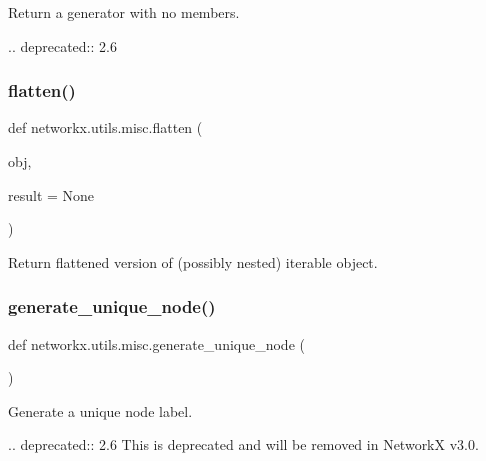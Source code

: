 \begin{DoxyVerb}Return a generator with no members.

.. deprecated:: 2.6
\end{DoxyVerb}
 \mbox{\label{namespacenetworkx_1_1utils_1_1misc_ab942ca72fb7de65e013cab73285c339d}} 
\subsubsection{\texorpdfstring{flatten()}{flatten()}}
{\footnotesize\ttfamily def networkx.\+utils.\+misc.\+flatten (\begin{DoxyParamCaption}\item[{}]{obj,  }\item[{}]{result = {\ttfamily None} }\end{DoxyParamCaption})}

\begin{DoxyVerb}Return flattened version of (possibly nested) iterable object.\end{DoxyVerb}
 \mbox{\label{namespacenetworkx_1_1utils_1_1misc_a3e735b0f0572a68c92123b6b2f842d1d}} 
\subsubsection{\texorpdfstring{generate\+\_\+unique\+\_\+node()}{generate\_unique\_node()}}
{\footnotesize\ttfamily def networkx.\+utils.\+misc.\+generate\+\_\+unique\+\_\+node (\begin{DoxyParamCaption}{ }\end{DoxyParamCaption})}

\begin{DoxyVerb}Generate a unique node label.

.. deprecated:: 2.6
    This is deprecated and will be removed in NetworkX v3.0.
\end{DoxyVerb}
 \mbox{\label{namespacenetworkx_1_1utils_1_1misc_ade1b11ea29ea0e65b27196990e1aa73b}} 
